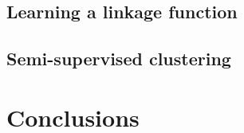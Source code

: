 \documentclass{article}
\newcommand{\msnote}[1]{\textcolor{blue}{[MS: #1]}}
\begin{document}



\subsection{Learning a linkage function}

\subsection{Semi-supervised clustering}



\section{Conclusions}
\label{conclusions}






\end{document}
